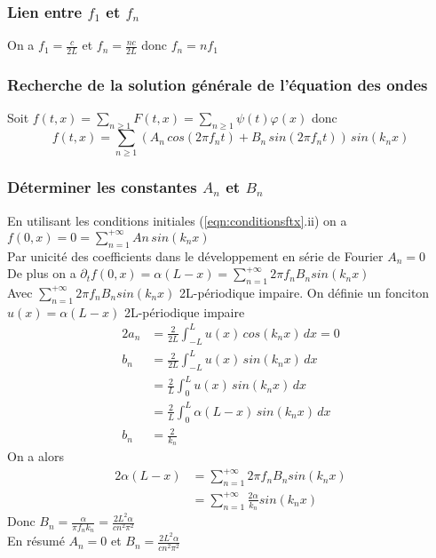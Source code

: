 \documentclass[12pt]{article}
\begin{document}
\subsubsection{Lien entre $f_1$ et $f_n$}
On a $f_1=\frac{c}{2L}$ et $f_n=\frac{nc}{2L}$ donc $\boxed{f_n=nf_1}$ \\
\subsubsection{Recherche de la solution générale de l'équation des ondes}
Soit $f(t,x)=\sum\limits_{n\geq 1} F(t,x)=\sum\limits_{n\geq 1} \psi(t)\varphi(x)$ donc
\begin{equation}
	\boxed{f(t,x)=\sum\limits_{n\geq 1}\left( A_n \, cos \left(2\pi f_n t\right)+B_n \, sin \left(2\pi f_n t\right)\right)\,sin(k_n x)}
\end{equation}
\subsubsection{Déterminer les constantes $A_n$ et $B_n$}
En utilisant les conditions initiales (\ref{eqn:conditionsftx}.ii) on a $f(0,x)=0=\sum\limits_{n=1}^{+\infty} An\,sin(k_n x)$ \\
Par unicité des coefficients dans le développement en série de Fourier $A_n=0$ \\
De plus on a $\partial_t f(0,x)=\alpha(L-x)=\sum\limits_{n=1}^{+\infty} 2\pi f_n B_n sin(k_n x)$ \\
Avec $\sum\limits_{n=1}^{+\infty} 2\pi f_n B_n sin(k_n x)$ 2L-périodique impaire.
\newpage
On définie un fonciton $u(x)=\alpha(L-x)$ 2L-périodique impaire  \\
\begin{alignat*}{2}
	a_n	&=\frac{2}{2L}	\int_{-L}^{L} u(x)\, cos(k_n x)\, dx=0 \\
	b_n	&=\frac{2}{2L}	\int_{-L}^{L} u(x)\, sin(k_n x)\, dx \\
		&=\frac{2}{L}	\int_{0}^{L} u(x)\, sin(k_n x)\, dx \\
		&=\frac{2}{L}	\int_{0}^{L} \alpha(L-x)\, sin(k_n x)\, dx \\
	b_n	&=\frac{2}{k_n}
\end{alignat*}
On a alors
\begin{alignat*}{2}
	\alpha(L-x)	&=\sum\limits_{n=1}^{+\infty} 2\pi f_n B_n sin(k_n x) \\
				&=\sum\limits_{n=1}^{+\infty} \frac{2\alpha}{k_n} sin(k_n x)
\end{alignat*}
Donc $\displaystyle B_n=\frac{\alpha}{\pi f_n k_n}=\frac{2L^2 \alpha}{cn^2\pi^2}$ \\
En résumé $\boxed{A_n=0}$ et $\displaystyle \boxed{B_n=\frac{2L^2 \alpha}{cn^2\pi^2}}$
\end{document}
